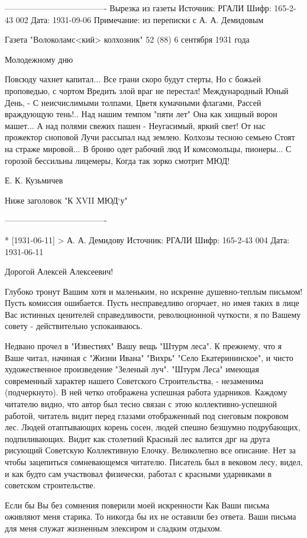 \documentclass[]{memoir}
\begin{document}
-------------------------------------
Вырезка из газеты
Источник: РГАЛИ
Шифр: 165-2-43 002
Дата: 1931-09-06
Примечание: из переписки с А. А. Демидовым

Газета "Волоколамс<кий> колхозник" 52 (88) 6 сентября 1931 года

Молодежному дню

Повсюду чахнет капитал...
Все грани скоро будут стерты,
Но с божьей проповедью, с чортом
Вредить злой враг не перестал!
Международный Юный День, -
С неисчислимыми толпами,
Цветя кумачными флагами,
Рассей враждующую тень!..
Над нашим темпом "пяти лет"
Она как хищный ворон машет...
А над полями свежих пашен - 
Неугасимый, яркий свет!
От нас прожектор сноповой
Лучи рассыпал над землею.
Колхозы тесною семьею
Стоят на страже мировой...
В броню одет рабочий люд
И комсомольцы, пионеры...
С горозой бессильны лицемеры,
Когда так зорко смотрит МЮД!

Е. К. Кузьмичев

Ниже заголовок
"К XVII МЮД`у"


-------------------------------------


* [1931-06-11] > А. А. Демидову 
Источник: РГАЛИ
Шифр: 165-2-43 004
Дата: 1931-06-11

Дорогой Алексей Алексеевич!

Глубоко тронут Вашим хотя и маленьким, но искренне душевно-теплым письмом! Пусть комиссия ошибается. Пусть несправедливо огорчает, но имея таких в лице Вас истинных ценителей справедливости, революционной чуткости, я по Вашему совету - действительно успокаиваюсь.

Недвано прочел в "Известиях" Вашу вещь "Штурм леса". К прежнему, что я Ваше читал, начиная с "Жизни Ивана" "Вихрь" "Село Екатерининское", и чисто художественное произведение "Зеленый луч". "Штурм Леса" имеющая современный характер нашего Советского Строительства, - незаменима (подчеркнуто). В ней четко отображена успешная работа ударников. Каждому читателю видно, что автор был тесно связан с этою коллективно-успешной работой, читатель видит перед глазами отображенный под снеговым покровом лес. Людей отаптывающих корень сосен, людей спешно безшумно подрубающих, подпиливающих. Видит как столетний Красный лес валится дрг на друга рисующий Советскую Коллективную Елочку. Великолепно все описание. Нет за чтобы зацепиться сомневающемся читателю. Писатель был в вековом лесу, видел, и как будто сам участвовал физически, работал с красными ударниками в советском строительстве.

Если бы Вы без сомнения поверили моей искренности Как Ваши письма оживляют меня старика. То никогда бы их не оставили без ответа. Ваши письма для меня служат жизненным элексиром и сладким отдыхом. 
\end{document}
